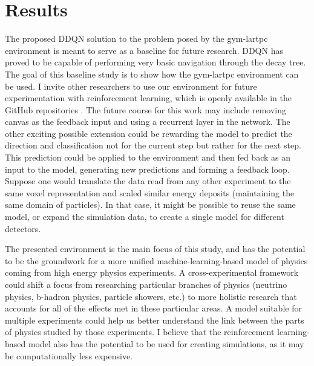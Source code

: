 \section{Results}
The proposed DDQN solution to the problem posed by the gym-lartpc environment is meant to serve as a baseline for future research. DDQN has proved to be capable of performing very basic navigation through the decay tree. The goal of this baseline study is to show how the gym-lartpc environment can be used.
I invite other researchers to use our environment for future experimentation with reinforcement learning, which is openly available in the GitHub repositories\cite{gymlartpc} \cite{dqn_lartpc}.
The future course for this work may include removing canvas as the feedback input and using a recurrent layer in the network.
The other exciting possible extension could be rewarding the model to predict the direction and classification not for the current step but rather for the next step. This prediction could be applied to the environment and then fed back as an input to the model, generating new predictions and forming a feedback loop.
Suppose one would translate the data read from any other experiment to the same voxel representation and scaled similar energy deposits (maintaining the same domain of particles). In that case, it might be possible to reuse the same model, or expand the simulation data, to create a single model for different detectors.

The presented environment is the main focus of this study, and has the potential to be the groundwork for a more unified machine-learning-based model of physics coming from high energy physics experiments.
A cross-experimental framework could shift a focus from researching particular branches of physics (neutrino physics, b-hadron physics, particle showers, etc.) to more holistic research that accounts for all of the effects met in these particular areas.
A model suitable for multiple experiments could help us better understand the link between the parts of physics studied by those experiments.
I believe that the reinforcement learning-based model also has the potential to be used for creating simulations, as it may be computationally less expensive.

